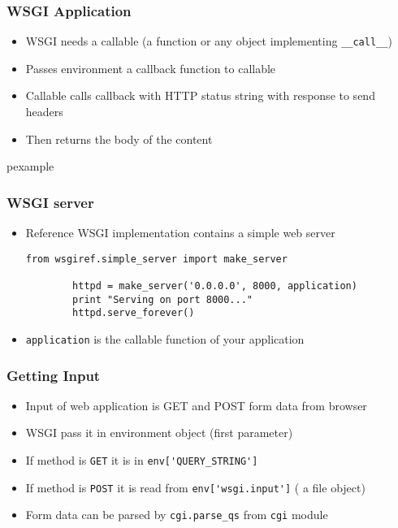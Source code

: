 \documentclass[trans,compress,xcolor=table]{beamer}
\begin{document}
\begin{frame}
\frametitle{WSGI Application}
\begin{itemize}
\item WSGI needs a callable (a function or any object implementing \lstinline!__call__!)
\item Passes environment a callback function to callable
\item Callable calls callback with HTTP status string with response to send
	headers
\item Then returns the body of the content
\end{itemize}
\begin{beamercolorbox}{pexample}
\simplewsgi
\end{beamercolorbox}
\end{frame}

\begin{frame}[fragile]
\frametitle{WSGI server}
\begin{itemize}
\item Reference WSGI implementation contains a simple web server
\begin{lstlisting}
from wsgiref.simple_server import make_server

        httpd = make_server('0.0.0.0', 8000, application)
        print "Serving on port 8000..."
        httpd.serve_forever()
\end{lstlisting}
\item \lstinline!application! is the callable function of your application
\end{itemize}
\end{frame}

\begin{frame}[fragile]
\frametitle{Getting Input}
\begin{itemize}
\item Input of web application is GET and POST form data from browser
\item WSGI pass it in environment object (first parameter)
\item If method is \lstinline!GET! it is in \lstinline!env['QUERY_STRING']!
\item If method is \lstinline!POST! it is read from \lstinline!env['wsgi.input']! ( a file object)
\item Form data can be parsed by \lstinline!cgi.parse_qs! from \lstinline!cgi! module
\end{itemize}
\end{frame}
\end{document}
